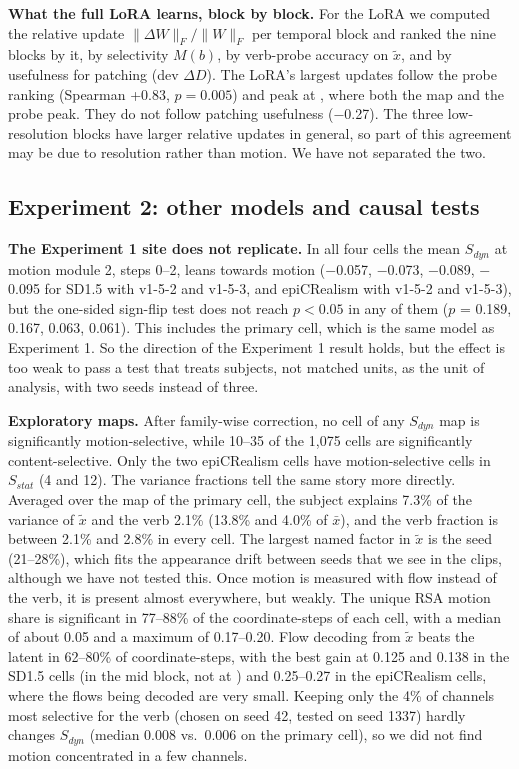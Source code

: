 \documentclass[twoside,english]{article}
\newcommand{\xs}{\bar{x}}         %
\newcommand{\xd}{\tilde{x}}       %
\newcommand{\dD}{\Delta D}
\begin{document}
\textbf{What the full LoRA learns, block by block.} For the  LoRA we computed the relative update
$\|\Delta W\|_F / \|W\|_F$ per temporal block and ranked the nine blocks by it, by selectivity $M(b)$, by
verb-probe accuracy on $\xd$, and by usefulness for patching (dev $\dD$). The LoRA's largest updates follow
the probe ranking (Spearman +0.83, $p = 0.005$) and peak at , where both the map and the
probe peak. They do not follow patching usefulness ($-$0.27). The three low-resolution blocks have larger
relative updates in general, so part of this agreement may be due to resolution rather than motion. We have
not separated the two.

\subsection{Experiment 2: other models and causal tests} \label{sec:res_exp2}

\textbf{The Experiment 1 site does not replicate.} In all four cells the mean $S_{dyn}$ at 
motion module 2, steps 0--2, leans towards motion ($-$0.057, $-$0.073, $-$0.089, $-$0.095 for SD1.5 with
\mbox{v1-5-2} and \mbox{v1-5-3}, and epiCRealism with \mbox{v1-5-2} and \mbox{v1-5-3}), but the one-sided
sign-flip test does not reach $p < 0.05$ in any of them ($p$ = 0.189, 0.167, 0.063, 0.061). This includes
the primary cell, which is the same model as Experiment 1. So the direction of the Experiment 1 result
holds, but the effect is too weak to pass a test that treats subjects, not matched units, as the unit of
analysis, with two seeds instead of three.

\textbf{Exploratory maps.} After family-wise correction, no cell of any $S_{dyn}$ map is significantly
motion-selective, while 10--35 of the 1{,}075 cells are significantly content-selective. Only the two
epiCRealism cells have motion-selective cells in $S_{stat}$ (4 and 12). The variance fractions tell the
same story more directly. Averaged over the map of the primary cell, the subject explains 7.3\% of the
variance of $\xd$ and the verb 2.1\% (13.8\% and 4.0\% of $\xs$), and the verb fraction is between 2.1\% and
2.8\% in every cell. The largest named factor in $\xd$ is the seed (21--28\%), which fits the appearance
drift between seeds that we see in the clips, although we have not tested this. Once motion is measured
with flow instead of the verb, it is present almost everywhere, but weakly. The unique RSA motion share is
significant in 77--88\% of the coordinate-steps of each cell, with a median of about 0.05 and a maximum of
0.17--0.20. Flow decoding from $\xd$ beats the latent in 62--80\% of coordinate-steps, with the best gain at
0.125 and 0.138 in the SD1.5 cells (in the mid block, not at ) and 0.25--0.27 in the
epiCRealism cells, where the flows being decoded are very small. Keeping only the 4\% of channels most
selective for the verb (chosen on seed 42, tested on seed 1337) hardly changes $S_{dyn}$ (median 0.008 vs.\
0.006 on the primary cell), so we did not find motion concentrated in a few channels.
\end{document}
